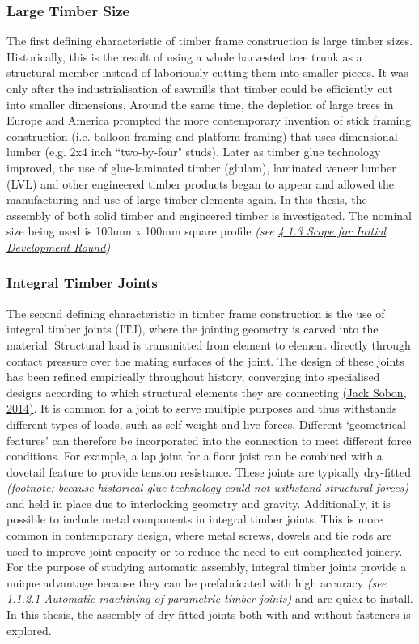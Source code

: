 \documentclass[11pt]{book}
\begin{document}
\subsubsection{Large Timber Size}

The first defining characteristic of timber frame construction is large timber sizes. Historically, this is the result of using a whole harvested tree trunk as a structural member instead of laboriously cutting them into smaller pieces. It was only after the industrialisation of sawmills that timber could be efficiently cut into smaller dimensions. Around the same time, the depletion of large trees in Europe and America prompted the more contemporary invention of stick framing construction (i.e. balloon framing and platform framing) that uses dimensional lumber (e.g. 2x4 inch ``two-by-four" studs). Later as timber glue technology improved, the use of glue-laminated timber (glulam), laminated veneer lumber (LVL) and other engineered timber products began to appear and allowed the manufacturing and use of large timber elements again. In this thesis, the assembly of both solid timber and engineered timber is investigated. The nominal size being used is 100mm x 100mm square profile \textit{(see \underline{4.1.3 Scope for Initial Development Round})} 

\subsubsection{Integral Timber Joints}

The second defining characteristic in timber frame construction is the use of integral timber joints (ITJ), where the jointing geometry is carved into the material.\textbf{ }Structural load is transmitted from element to element directly through contact pressure over the mating surfaces of the joint. The design of these joints has been refined empirically throughout history, converging into specialised designs according to which structural elements they are connecting \href{https://www.zotero.org/google-docs/?BttU29}{(Jack Sobon, 2014)}. It is common for a joint to serve multiple purposes and thus withstands different types of loads, such as self-weight and live forces. Different ‘geometrical features’ can therefore be incorporated into the connection to meet different force conditions. For example, a lap joint for a floor joist can be combined with a dovetail feature to provide tension resistance. These joints are typically dry-fitted \textit{(footnote: because historical glue technology could not withstand structural forces) }and held in place due to interlocking geometry and gravity. Additionally, it is possible to include metal components in integral timber joints. This is more common in contemporary design, where metal screws, dowels and tie rods are used to improve joint capacity or to reduce the need to cut complicated joinery. For the purpose of studying automatic assembly, integral timber joints provide a unique advantage because they can be prefabricated with high accuracy \textit{(see \underline{1.1.2.1 Automatic machining of parametric timber joints})} and are quick to install. In this thesis, the assembly of dry-fitted joints both with and without fasteners is explored.
\end{document}
